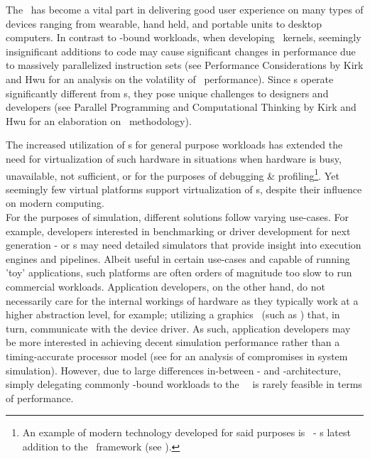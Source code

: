 \noindent
The \dvttermgpu\ has become a vital part in delivering good user experience on many types of devices ranging from wearable, hand held, and portable units to desktop computers. %
In contrast to \dvttermcpu -bound workloads, when developing \dvttermgpu\ kernels, seemingly insignificant additions to code may cause significant changes in performance due to massively parallelized instruction sets (see Performance Considerations by Kirk and Hwu for an analysis on the volatility of \dvttermgpu\ performance).
Since \dvttermgpu s operate significantly different from \dvttermcpu s, they pose unique challenges to designers and developers (see Parallel Programming and Computational Thinking by Kirk and Hwu for an elaboration on \dvttermgpgpu\ methodology).

The increased utilization of \dvttermgpu s for general purpose workloads has extended the need for virtualization of such hardware in situations when hardware is busy, unavailable, not sufficient, or for the purposes of debugging \& profiling\footnote{An example of modern technology developed for said purposes is \dvttermwarp\ - \dvttermmicrosoft s latest addition to the \dvttermdirectx\ framework (see ).}.
Yet seemingly few virtual platforms support virtualization of \dvttermgpu s, despite their influence on modern computing.\\

\noindent
For the purposes of simulation, different solutions follow varying use-cases. For example, developers interested in benchmarking or driver development for next generation \dvttermgpu - or \dvttermcpu s may need detailed simulators that provide insight into execution engines and pipelines.
Albeit useful in certain use-cases and capable of running 'toy' applications, such platforms are often orders of magnitude too slow to run commercial workloads.
Application developers, on the other hand, do not necessarily care for the internal workings of hardware as they typically work at a higher abstraction level, for example; utilizing a graphics \dvttermapi\ (such as \dvttermopengl ) that, in turn, communicate with the device driver.
As such, application developers may be more interested in achieving decent simulation performance rather than a timing-accurate processor model (see  for an analysis of compromises in system simulation).
However, due to large differences in-between \dvttermcpu - and \dvttermgpu -architecture, simply delegating commonly \dvttermgpu -bound workloads to the \dvttermhost\ \dvttermcpu\ is rarely feasible in terms of performance.

